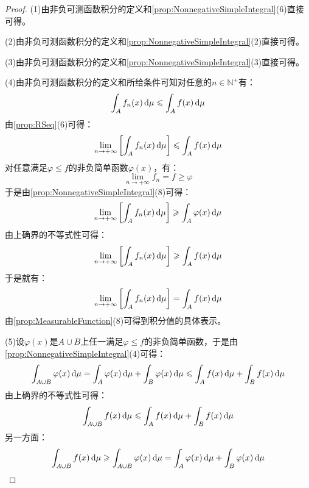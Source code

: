 \begin{proof}
	(1)由非负可测函数积分的定义和\cref{prop:NonnegativeSimpleIntegral}(6)直接可得。\par
	(2)由非负可测函数积分的定义和\cref{prop:NonnegativeSimpleIntegral}(2)直接可得。\par
	(3)由非负可测函数积分的定义和\cref{prop:NonnegativeSimpleIntegral}(3)直接可得。\par
	(4)由非负可测函数积分的定义和所给条件可知对任意的$n\in\mathbb{N}^+$有：
	\begin{equation*}
		\int_{A}f_n(x)\mathop{}\!\mathrm{d}\mu\leqslant\int_{A}f(x)\mathop{}\!\mathrm{d}\mu
	\end{equation*}
	由\cref{prop:RSeq}(6)可得：
	\begin{equation*}
		\lim_{n\to+\infty}\left[\int_{A}f_n(x)\mathop{}\!\mathrm{d}\mu\right]\leqslant\int_{A}f(x)\mathop{}\!\mathrm{d}\mu
	\end{equation*}
	对任意满足$\varphi\leqslant f$的非负简单函数$\varphi(x)$，有：
	\begin{equation*}
		\lim_{n\to+\infty}f_n=f\geqslant\varphi
	\end{equation*}
	于是由\cref{prop:NonnegativeSimpleIntegral}(8)可得：
	\begin{equation*}
		\lim_{n\to+\infty}\left[\int_{A}f_n(x)\mathop{}\!\mathrm{d}\mu\right]\geqslant\int_{A}\varphi(x)\mathop{}\!\mathrm{d}\mu
	\end{equation*}
	由上确界的不等式性可得：
	\begin{equation*}
		\lim_{n\to+\infty}\left[\int_{A}f_n(x)\mathop{}\!\mathrm{d}\mu\right]\geqslant\int_{A}f(x)\mathop{}\!\mathrm{d}\mu
	\end{equation*}
	于是就有：
	\begin{equation*}
		\lim_{n\to+\infty}\left[\int_{A}f_n(x)\mathop{}\!\mathrm{d}\mu\right]=\int_{A}f(x)\mathop{}\!\mathrm{d}\mu
	\end{equation*}
	由\cref{prop:MeasurableFunction}(8)可得到积分值的具体表示。\par
	(5)设$\varphi(x)$是$A\cup B$上任一满足$\varphi\leqslant f$的非负简单函数，于是由\cref{prop:NonnegativeSimpleIntegral}(4)可得：
	\begin{equation*}
		\int_{A\cup B}\varphi(x)\mathop{}\!\mathrm{d}\mu=\int_{A}\varphi(x)\mathop{}\!\mathrm{d}\mu+\int_{B}\varphi(x)\mathop{}\!\mathrm{d}\mu\leqslant\int_{A}f(x)\mathop{}\!\mathrm{d}\mu+\int_{B}f(x)\mathop{}\!\mathrm{d}\mu
	\end{equation*}
	由上确界的不等式性可得：
	\begin{equation*}
		\int_{A\cup B}f(x)\mathop{}\!\mathrm{d}\mu\leqslant\int_{A}f(x)\mathop{}\!\mathrm{d}\mu+\int_{B}f(x)\mathop{}\!\mathrm{d}\mu
	\end{equation*}
	另一方面：
	\begin{equation*}
		\int_{A\cup B}f(x)\dif\mu\geqslant\int_{A\cup B}\varphi(x)\dif\mu=\int_{A}\varphi(x)\dif\mu+\int_{B}\varphi(x)\dif\mu

\end{equation*}
\end{proof}
